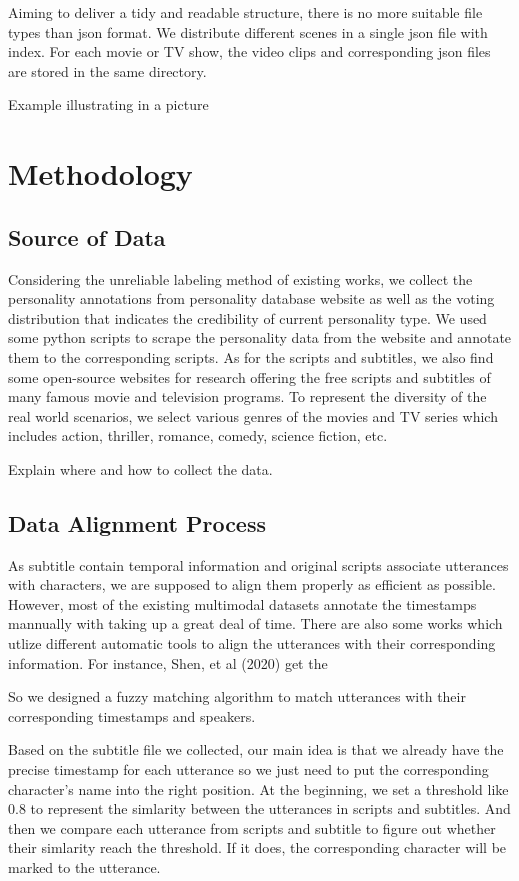 \documentclass[11pt]{article}
\begin{document}
Aiming to deliver a tidy and readable structure, there is no more suitable file types than json format. We distribute different scenes in a single json file with index. For each movie or TV show, the video clips and corresponding json files are stored in the same directory.

Example illustrating in a picture

\section{Methodology}

\subsection{Source of Data}

Considering the unreliable labeling method of existing works, we collect the personality annotations from personality database website as well as the voting distribution that indicates the credibility of current personality type. We used some python scripts to scrape the personality data from the website and annotate them to the corresponding scripts. As for the scripts and subtitles, we also find some open-source websites for research offering the free scripts and subtitles of many famous movie and television programs. To represent the diversity of the real world scenarios, we select various genres of the movies and TV series which includes action, thriller, romance, comedy, science fiction, etc.

Explain where and how to collect the data. 

\subsection{Data Alignment Process}

As subtitle contain temporal information and original scripts associate utterances with characters, we are supposed to align them properly as efficient as possible. However, most of the existing multimodal datasets annotate the timestamps mannually with taking up a great deal of time. There are also some works which utlize different automatic tools to align the utterances with their corresponding information. For instance, Shen, et al (2020) get the 

So we designed a fuzzy matching algorithm to match utterances with their corresponding timestamps and speakers. 

Based on the subtitle file we collected, our main idea is that we already have the precise timestamp for each utterance so we just need to put the corresponding character's name into the right position. At the beginning, we set a threshold like 0.8 to represent the simlarity between the utterances in scripts and subtitles. And then we compare each utterance from scripts and subtitle to figure out whether their simlarity reach the threshold. If it does, the corresponding character will be marked to the utterance. 
\end{document}

